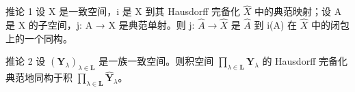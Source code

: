 推论 1 设 X 是一致空间，i 是 X 到其 Hausdorff 完备化 \(\hat{X}\) 中的典范映射；设 A 是 X 的子空间，j: A → X 是典范单射。则 j: \(\hat{A} \rightarrow \hat{X}\) 是 \(\hat{A}\) 到 i(A) 在 \(\hat{X}\) 中的闭包上的一个同构。

推论 2 设 \((\mathbf{Y}_{\lambda})_{\lambda \in \mathbf{L}}\) 是一族一致空间。则积空间 \(\prod_{\lambda \in \mathbf{L}}\mathbf{Y}_{\lambda}\) 的 Hausdorff 完备化典范地同构于积 \(\prod_{\lambda \in \mathbf{L}}\hat{\mathbf{Y}}_{\lambda}\)。

